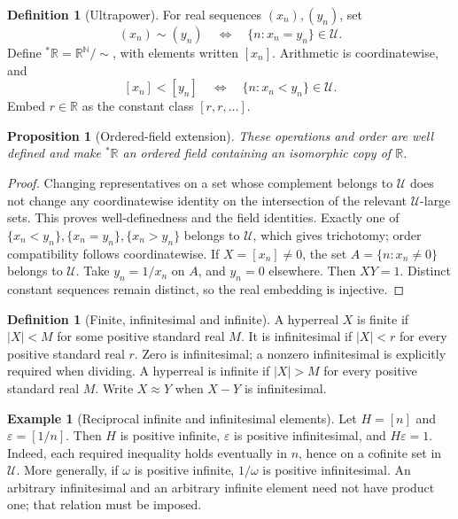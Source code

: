 \documentclass[11pt]{article}
\newtheorem{proposition}[theorem]{Proposition}
\theoremstyle{definition}
\newtheorem{definition}[theorem]{Definition}
\newtheorem{example}[theorem]{Example}
\theoremstyle{remark}
\newcommand{\RR}{\mathbb R}
\newcommand{\NN}{\mathbb N}
\newcommand{\HR}{{}^{*}\mathbb R}
\newcommand{\U}{\mathcal U}
\begin{document}
\begin{definition}[Ultrapower]\label{def:ultrapower}
For real sequences \((x_n),(y_n)\), set
\[
(x_n)\sim(y_n)\quad\Longleftrightarrow\quad\{n:x_n=y_n\}\in\U.
\]
Define \(\HR=\RR^{\NN}/\!\sim\), with elements written \([x_n]\).
Arithmetic is coordinatewise, and
\[
[x_n]<[y_n]\quad\Longleftrightarrow\quad\{n:x_n<y_n\}\in\U.
\]
Embed \(r\in\RR\) as the constant class \([r,r,\ldots]\).
\end{definition}
\begin{proposition}[Ordered-field extension]\label{prop:field}
These operations and order are well defined and make \(\HR\) an ordered
field containing an isomorphic copy of \(\RR\).
\end{proposition}
\begin{proof}
Changing representatives on a set whose complement belongs to \(\U\) does not
change any coordinatewise identity on the intersection of the relevant
\(\U\)-large sets. This proves well-definedness and the field identities.
Exactly one of \(\{x_n<y_n\},\{x_n=y_n\},\{x_n>y_n\}\) belongs to \(\U\),
which gives trichotomy; order compatibility follows coordinatewise.
If \(X=[x_n]\ne0\), the set \(A=\{n:x_n\ne0\}\) belongs to \(\U\).
Take \(y_n=1/x_n\) on \(A\), and \(y_n=0\) elsewhere. Then \(XY=1\).
Distinct constant sequences remain distinct, so the real embedding is injective.
\end{proof}

\begin{definition}[Finite, infinitesimal and infinite]\label{def:sizes}
A hyperreal \(X\) is finite if \(|X|<M\) for some positive standard real \(M\).
It is infinitesimal if \(|X|<r\) for every positive standard real \(r\).
Zero is infinitesimal; a nonzero infinitesimal is explicitly required when dividing.
A hyperreal is infinite if \(|X|>M\) for every positive standard real \(M\).
Write \(X\approx Y\) when \(X-Y\) is infinitesimal.
\end{definition}
\begin{example}[Reciprocal infinite and infinitesimal elements]\label{ex:reciprocal}
Let \(H=[n]\) and \(\varepsilon=[1/n]\). Then \(H\) is positive infinite,
\(\varepsilon\) is positive infinitesimal, and \(H\varepsilon=1\).
Indeed, each required inequality holds eventually in \(n\), hence on a
cofinite set in \(\U\). More generally, if \(\omega\) is positive infinite,
\(1/\omega\) is positive infinitesimal. An arbitrary infinitesimal and an
arbitrary infinite element need not have product one; that relation must be imposed.
\end{example}
\end{document}
